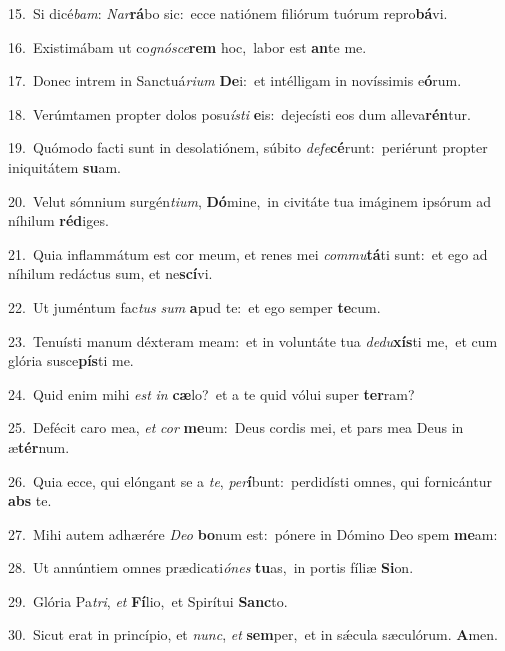 {\numbfont\textcolor{\numbcolor}{15.}}~Si dicé\-\textit{bam}\-: \textit{Nar}\-\textbf{rá}bo sic:~\star ecce natiónem filiórum tuórum repro\-\textbf{bá}\-vi.\par
{\numbfont\textcolor{\numbcolor}{16.}}~Existimábam ut co\-\textit{gnó}\-\textit{sce}\textbf{rem} hoc,~\star labor est \textbf{an}\-te me.\par
{\numbfont\textcolor{\numbcolor}{17.}}~Donec intrem in Sanctuá\-\textit{ri}\-\textit{um} \textbf{De}\-i:~\star et intélligam in novíssimis e\-\textbf{ó}\-rum.\par
{\numbfont\textcolor{\numbcolor}{18.}}~Verúmtamen propter dolos posu\-\textit{ís}\-\textit{ti} \textbf{e}\-is:~\star dejecísti eos dum alleva\-\textbf{rén}\-tur.\par
{\numbfont\textcolor{\numbcolor}{19.}}~Quómodo facti sunt in desolatiónem, súbito \textit{de}\-\textit{fe}\textbf{cé}runt:~\star periérunt propter iniquitátem \textbf{su}\-am.\par
{\numbfont\textcolor{\numbcolor}{20.}}~Velut sómnium surgén\-\textit{ti}\-\textit{um}, \textbf{Dó}\-mine,~\star in civitáte tua imáginem ipsórum ad níhilum \textbf{réd}\-iges.\par
{\numbfont\textcolor{\numbcolor}{21.}}~Quia inflammátum est cor meum, et renes mei \textit{com}\-\textit{mu}\textbf{tá}ti sunt:~\star et ego ad níhilum redáctus sum, et ne\-\textbf{scí}\-vi.\par
{\numbfont\textcolor{\numbcolor}{22.}}~Ut juméntum fac\textit{tus} \textit{sum} \textbf{a}\-pud te:~\star et ego semper \textbf{te}\-cum.\par
{\numbfont\textcolor{\numbcolor}{23.}}~Tenuísti manum déxteram meam:~\dagger et in voluntáte tua \textit{de}\-\textit{du}\textbf{xís}ti me,~\star et cum glória susce\-\textbf{pís}\-ti me.\par
{\numbfont\textcolor{\numbcolor}{24.}}~Quid enim mihi \textit{est} \textit{in} \textbf{cæ}\-lo?~\star et a te quid vólui super \textbf{ter}\-ram?\par
{\numbfont\textcolor{\numbcolor}{25.}}~Defécit caro mea, \textit{et} \textit{cor} \textbf{me}\-um:~\star Deus cordis mei, et pars mea Deus in æ\-\textbf{tér}\-num.\par
{\numbfont\textcolor{\numbcolor}{26.}}~Quia ecce, qui elóngant se a \textit{te}\-, \textit{per}\-\textbf{í}bunt:~\star perdidísti omnes, qui fornicántur \textbf{abs} te.\par
{\numbfont\textcolor{\numbcolor}{27.}}~Mihi autem adhærére \textit{De}\-\textit{o} \textbf{bo}\-num est:~\star pónere in Dómino Deo spem \textbf{me}\-am:\par
{\numbfont\textcolor{\numbcolor}{28.}}~Ut annúntiem omnes prædicati\-\textit{ó}\-\textit{nes} \textbf{tu}\-as,~\star in portis fíliæ \textbf{Si}\-on.\par
{\numbfont\textcolor{\numbcolor}{29.}}~Glória Pa\-\textit{tri}\-, \textit{et} \textbf{Fí}\-lio,~\star et Spirítui \textbf{Sanc}\-to.\par
{\numbfont\textcolor{\numbcolor}{30.}}~Sicut erat in princípio, et \textit{nunc}\-, \textit{et} \textbf{sem}\-per,~\star et in sǽcula sæculórum. \textbf{A}\-men.\par
